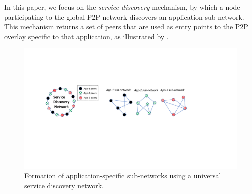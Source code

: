 
In this paper, we focus on the \emph{service discovery} mechanism, by which a node participating to the global P2P network discovers an application sub-network.
This mechanism returns a set of peers that are used as entry points to the P2P overlay specific to that application, as illustrated by .

\begin{figure}[b!]
    \includegraphics[width=1\linewidth]{img/subnetwork}
    \caption{Formation of application-specific sub-networks using a universal service discovery network.
    \protect{}
    }
    \label{fig:subnetwork}
\end{figure}

